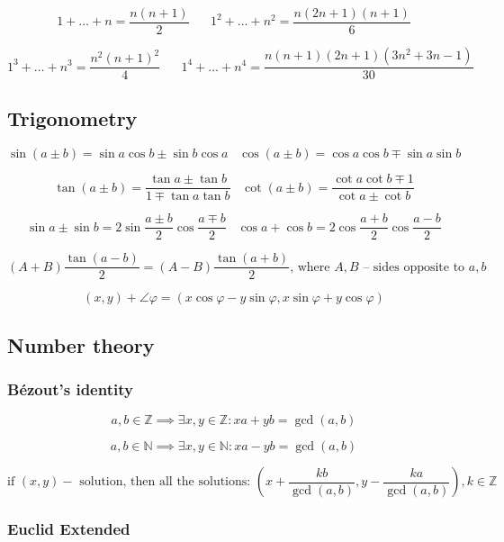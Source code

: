 $$
1 + \ldots + n = \frac{n(n+1)}{2}
\hspace{20pt}
1^2 + \ldots + n^2 = \frac{n(2n+1)(n+1)}{6}
$$

$$
1^3 + \ldots + n^3 = \frac{n^2(n+1)^2}{4}
\hspace{20pt}
1^4 + \ldots + n^4 = \frac{n(n+1)(2n+1)(3n^2+3n-1)}{30}
$$

\subsection{Trigonometry}

$$
\sin(a \pm b) = \sin a \cos b \pm \sin b \cos a
\;\;\;
\cos(a \pm b) = \cos a \cos b \mp \sin a \sin b
$$

$$
\tan(a \pm b) = \frac{\tan a \pm \tan b}{1 \mp \tan a \tan b}
\;\;\;
\cot(a \pm b) = \frac{\cot a \cot b \mp 1}{\cot a \pm \cot b}
$$

$$
\sin a \pm \sin b = 2 \sin\frac{a \pm b}{2} \cos\frac{a \mp b}{2}
\;\;\;
\cos a + \cos b = 2 \cos\frac{a + b}{2} \cos\frac{a - b}{2}
$$

$$
(A + B) \frac{\tan(a - b)}{2} = (A - B) \frac{\tan(a + b)}{2}
\text{, where } A, B \text{ -- sides opposite to } a, b
$$

$$
(x, y) + \angle\varphi = (x \cos\varphi - y \sin\varphi, x \sin\varphi + y \cos\varphi)
$$

\subsection{Number theory}

\subsubsection{Bézout's identity}

$$
a, b \in \mathbb{Z}
\implies
\exists x, y \in \mathbb{Z}: xa + yb = \gcd{(a, b)}
$$

\vspace{-1em}
$$
a, b \in \mathbb{N}
\implies
\exists x, y \in \mathbb{N}: xa - yb = \gcd{(a, b)}
$$

\vspace{-1em}
$$
\text{if } (x, y) - \text{ solution, then all the solutions: }
\left(
  x + \frac{kb}{\gcd{(a, b)}}, y - \frac{ka}{\gcd{(a, b)}}
\right), k \in \mathbb{Z}
$$

\subsubsection{Euclid Extended}

